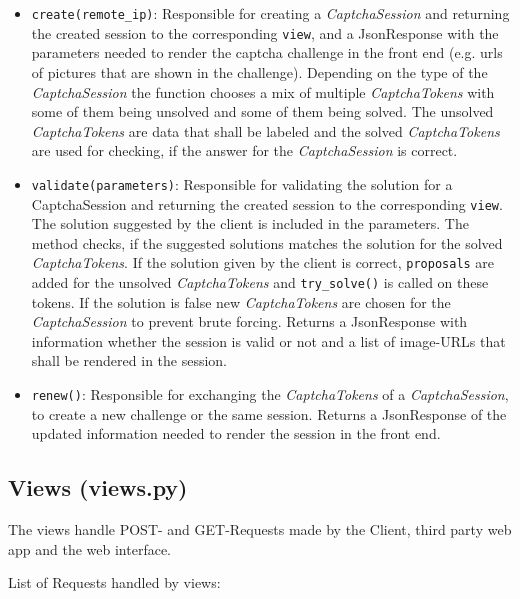 \begin{itemize}
\item \verb|create(remote_ip)|: Responsible for creating a \emph{CaptchaSession} and returning the created session to the corresponding \verb|view|, and a JsonResponse with the parameters needed to render the captcha challenge in the front end (e.g. urls of pictures that are shown in the challenge). Depending on the type of the \emph{CaptchaSession} the function chooses a mix of multiple \emph{CaptchaTokens} with some of them being unsolved and some of them being solved. The unsolved \emph{CaptchaTokens} are data that shall be labeled and the solved \emph{CaptchaTokens} are used for checking, if the answer for the \emph{CaptchaSession} is correct. 
\item \verb|validate(parameters)|: Responsible for validating the solution for a CaptchaSession and returning the created session to the corresponding \verb|view|. The solution suggested by the client is included in the parameters. The method checks, if the suggested solutions matches the solution for the solved \emph{CaptchaTokens}. If the solution given by the client is correct, \verb|proposals| are added for the unsolved \emph{CaptchaTokens} and \verb|try_solve()| is called on these tokens. If the solution is false new \emph{CaptchaTokens} are chosen for the \emph{CaptchaSession} to prevent brute forcing. Returns a JsonResponse with information whether the session is valid or not and a list of image-URLs that shall be rendered in the session.
\item \verb|renew()|: Responsible for exchanging the \emph{CaptchaTokens} of a \emph{CaptchaSession}, to create a new challenge or the same session. Returns a JsonResponse of the updated information needed to render the session in the front end.
\end{itemize}


\subsection{Views (views.py)}

The views handle POST- and GET-Requests made by the Client, third party web app and the web interface. 

List of Requests handled by views:

